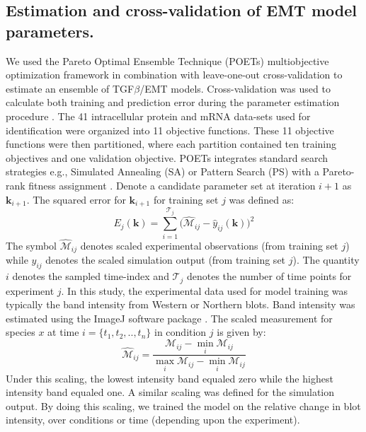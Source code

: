 \newpage

\subsection*{Estimation and cross-validation of EMT model parameters.}
We used the Pareto Optimal Ensemble Technique (POETs) multiobjective optimization framework in combination with leave-one-out cross-validation to estimate an ensemble of TGF$\beta$/EMT models.
Cross-validation was used to calculate both training and prediction error during the parameter estimation procedure \cite{kohavi1995study}.
The 41 intracellular protein and mRNA data-sets used for identification were organized into 11 objective functions.
These 11 objective functions were then partitioned, where each partition contained ten training objectives and one validation objective.
POETs integrates standard search strategies e.g., Simulated Annealing (SA) or Pattern Search (PS)
with a Pareto-rank fitness assignment \cite{Song:2010fk}.
Denote a candidate parameter set at iteration $i+1$ as $\mathbf{k}_{i+1}$.
The squared error for $\mathbf{k}_{i+1}$ for training set $j$ was defined as:
\begin{equation}\label{eqn_cost2}
	E_{j}(\mathbf{k}) = \sum_{i=1}^{\mathcal{T}_{j}}\biggl(\hat{\mathcal{M}}_{ij}-\hat{y}_{ij}(\mathbf{k})\biggr)^2
\end{equation}
The symbol $\hat{\mathcal{M}}_{ij}$ denotes scaled experimental observations (from training set $j$) while $\hat{y}_{ij}$ denotes the scaled simulation output (from training set $j$).
The quantity $i$ denotes the sampled time-index and $\mathcal{T}_{j}$ denotes the number of time points for experiment $j$.
In this study, the experimental data used for model training was typically the band intensity from Western or Northern blots.
Band intensity was estimated using the ImageJ software package \cite{IMAGEJ}.
The scaled measurement for species $x$ at time $i=\{t_{1},t_{2},..,t_{n}\}$ in condition $j$ is given by:
\begin{equation}\label{norm_exp_data}
\hat{\mathcal{M}}_{ij} = \frac{\mathcal{M}_{ij} - \min_{i}\mathcal{M}_{ij}}{\max_{i}{\mathcal{M}_{ij}}-\min_{i}{\mathcal{M}_{ij}}}
\end{equation}
Under this scaling, the lowest intensity band equaled zero while the highest intensity band equaled one.
A similar scaling was defined for the simulation output. By doing this scaling, we trained the model on the relative change in blot intensity, over conditions or time (depending upon the experiment).
